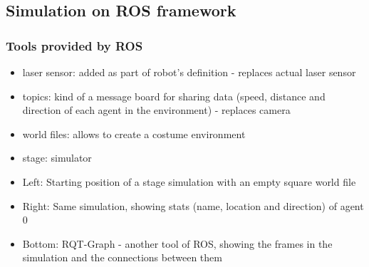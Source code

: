\documentclass[a0,portrait]{a0poster}
\begin{document}
\begin{multicols}{2}
\subsection*{Simulation on ROS framework}
\subsubsection*{Tools provided by ROS}
\begin{itemize}
\item laser sensor: added as part of robot's definition - replaces actual laser sensor
\item topics: kind of a message board for sharing data (speed, distance and direction of each agent in the environment) - replaces camera
\item world files: allows to create a costume environment
\item stage: simulator
\end{itemize}


\begin{itemize}
\item Left: Starting position of a stage simulation with an empty square world file
\item Right: Same simulation, showing stats (name, location and direction) of agent 0
\item Bottom: RQT-Graph - another tool of ROS, showing the frames in the simulation and the connections between them
\end{itemize}





\end{multicols}
\end{document}
